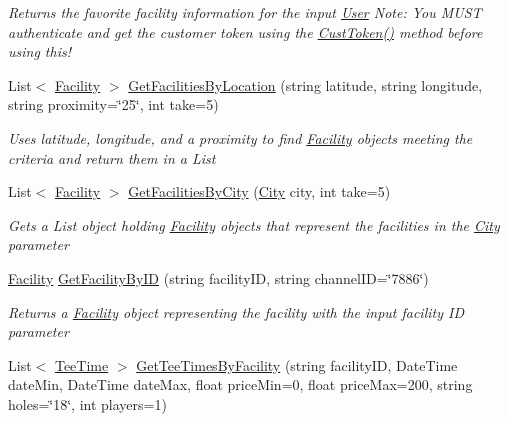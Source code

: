 \begin{DoxyCompactItemize}
\begin{DoxyCompactList}\small\item\em Returns the favorite facility information for the input \mbox{\hyperlink{class_golf_now_a_p_i_1_1_user}{User}} Note\+: You M\+U\+ST authenticate and get the customer token using the \mbox{\hyperlink{class_golf_now_a_p_i_1_1_golf_now_a_p_i_handler_a8ba0b542b68c1e48166b59c6d6b167fd}{Cust\+Token()}} method before using this! \end{DoxyCompactList}\item 
List$<$ \mbox{\hyperlink{class_golf_now_a_p_i_1_1_facility}{Facility}} $>$ \mbox{\hyperlink{class_golf_now_a_p_i_1_1_golf_now_a_p_i_handler_a98f9a1d8ee47db7d33b6b76ccfc8cb5e}{Get\+Facilities\+By\+Location}} (string latitude, string longitude, string proximity=\char`\"{}25\char`\"{}, int take=5)
\begin{DoxyCompactList}\small\item\em Uses latitude, longitude, and a proximity to find \mbox{\hyperlink{class_golf_now_a_p_i_1_1_facility}{Facility}} objects meeting the criteria and return them in a List \end{DoxyCompactList}\item 
List$<$ \mbox{\hyperlink{class_golf_now_a_p_i_1_1_facility}{Facility}} $>$ \mbox{\hyperlink{class_golf_now_a_p_i_1_1_golf_now_a_p_i_handler_a075e65b0fa1732030985ab11a1efe429}{Get\+Facilities\+By\+City}} (\mbox{\hyperlink{class_golf_now_a_p_i_1_1_city}{City}} city, int take=5)
\begin{DoxyCompactList}\small\item\em Gets a List object holding \mbox{\hyperlink{class_golf_now_a_p_i_1_1_facility}{Facility}} objects that represent the facilities in the \mbox{\hyperlink{class_golf_now_a_p_i_1_1_city}{City}} parameter \end{DoxyCompactList}\item 
\mbox{\hyperlink{class_golf_now_a_p_i_1_1_facility}{Facility}} \mbox{\hyperlink{class_golf_now_a_p_i_1_1_golf_now_a_p_i_handler_aa0c91d6d6039da17040e8c3012a1b029}{Get\+Facility\+By\+ID}} (string facility\+ID, string channel\+ID=\char`\"{}7886\char`\"{})
\begin{DoxyCompactList}\small\item\em Returns a \mbox{\hyperlink{class_golf_now_a_p_i_1_1_facility}{Facility}} object representing the facility with the input facility ID parameter \end{DoxyCompactList}\item 
List$<$ \mbox{\hyperlink{class_golf_now_a_p_i_1_1_tee_time}{Tee\+Time}} $>$ \mbox{\hyperlink{class_golf_now_a_p_i_1_1_golf_now_a_p_i_handler_a5f6cdb505b87125d08807af01c2d3341}{Get\+Tee\+Times\+By\+Facility}} (string facility\+ID, Date\+Time date\+Min, Date\+Time date\+Max, float price\+Min=0, float price\+Max=200, string holes=\char`\"{}18\char`\"{}, int players=1)

\end{DoxyCompactItemize}
